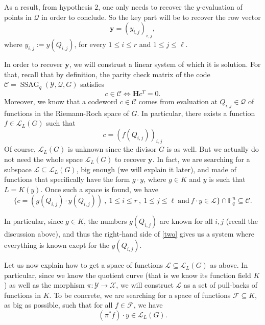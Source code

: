 \documentclass[10pt]{article}
\theoremstyle{definition}
\theoremstyle{definition}
\theoremstyle{definition}
\newcommand{\s}{\vspace{0.3cm}}
\newcommand{\cd}{\cdot}
\newcommand{\fq}{\mathbb{F}_q}
\newcommand{\su}{\subseteq}
\newcommand{\X}{\mathcal{X}}
\newcommand{\Y}{\mathcal{Y}}
\newcommand{\QR}{\mathcal{Q}}
\newcommand{\ssag}{\operatorname{SSAG}}
\newcommand{\calL}{\mathcal{L}}
\begin{document}
As a result, from hypothesis $2$, one only needs to recover the $y$-evaluation of points in $\QR$ in order to conclude. So the key part will be to recover the row vector
\begin{equation}
\textbf{y} = (y_{i,j})_{i,j},
\end{equation}
where $y_{i,j} := y(Q_{i,j})$, for every $1 \leq i \leq r$ and $1 \leq j \leq \ell$.

\s

In order to recover $\mathbf{y}$, we will construst a linear system of which it is solution. For that, recall that by definition, the parity check matrix of the code $\mathcal{C}=\ssag_q(\Y,\QR,G)$ satisfies
\begin{equation} \label{two}
c \in \mathcal{C} \iff \mathbf{H}c^T = 0.
\end{equation}
Moreover, we know that a codeword $c \in \mathcal{C}$ comes from evaluation at $Q_{i,j} \in \QR$ of functions in the Riemann-Roch space of $G$. In particular, there exists a function $f \in \calL_L(G)$ such that  
\[c = (f(Q_{i,j}))_{i,j}\]
Of course, $\calL_L(G)$ is unknown since the divisor $G$ is as well. But we actually do not need the whole space $\calL_L(G)$ to recover $\mathbf{y}$. In fact, we are searching for a subspace $\mathcal{L} \su \calL_L(G)$, big enough (we will explain it later), and made of functions that specifically have the form $g \cd y$, where $g \in K$ and $y$ is such that $L=K(y)$. Once such a space is found, we have 
\[\{c= (g(Q_{i,j}) \cd y(Q_{i,j})) \ , \ 1 \leq i \leq r \ , \ 1 \leq j \leq \ell \ \textrm{and} \ f\cd y \in \mathcal{L}\} \cap \fq^n \su \mathcal{C}.\] 

In particular, since $g \in K$, the numbers $g(Q_{i,j})$ are known for all $i,j$ (recall the discussion above), and thus the right-hand side of \eqref{two} gives us a system where everything is known exept for the $y(Q_{i,j})$.

\s

Let us now explain how to get a space of functions $\mathcal{L} \su \calL_L(G)$ as above. In particular, since we know the quotient curve (that is we know its function field $K$) as well as the morphism $\pi : \Y \rightarrow \X$, we will construct $\mathcal{L}$ as a set of pull-backs of functions in $K$. To be concrete, we are searching for a space of functions $\mathcal{F} \su K$, as big as possible, such that for all $f \in \mathcal{F}$, we have
\begin{equation} \label{three}
(\pi^*f) \cd y \in \calL_L(G). 
\end{equation}
\end{document}
